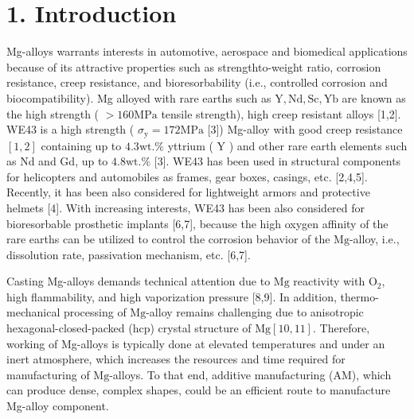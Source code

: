 \documentclass[10pt]{article}
\begin{document}
\section*{1. Introduction}
Mg-alloys warrants interests in automotive, aerospace and biomedical applications because of its attractive properties such as strengthto-weight ratio, corrosion resistance, creep resistance, and bioresorbability (i.e., controlled corrosion and biocompatibility). Mg alloyed with rare earths such as $\mathrm{Y}, \mathrm{Nd}, \mathrm{Sc}, \mathrm{Yb}$ are known as the high strength ( $>160 \mathrm{MPa}$ tensile strength), high creep resistant alloys [1,2]. WE43 is a high strength ( $\sigma_{\mathrm{y}}=172 \mathrm{MPa}$ [3]) Mg-alloy with good creep resistance $[1,2]$ containing up to $4.3 \mathrm{wt} . \%$ yttrium ( $\mathrm{Y}$ ) and other rare earth elements such as Nd and Gd, up to $4.8 \mathrm{wt} . \%$ [3]. WE43 has been used in structural components for helicopters and automobiles as frames, gear boxes, casings, etc. [2,4,5]. Recently, it has been also considered for lightweight armors and protective helmets [4]. With increasing interests, WE43 has been also considered for bioresorbable prosthetic implants [6,7], because the high oxygen affinity of the rare earths can be utilized to control the corrosion behavior of the $\mathrm{Mg}$-alloy, i.e., dissolution rate, passivation mechanism, etc. [6,7].

Casting Mg-alloys demands technical attention due to $\mathrm{Mg}$ reactivity with $\mathrm{O}_{2}$, high flammability, and high vaporization pressure [8,9]. In addition, thermo-mechanical processing of $\mathrm{Mg}$-alloy remains challenging due to anisotropic hexagonal-closed-packed (hcp) crystal structure of $\mathrm{Mg}[10,11]$. Therefore, working of Mg-alloys is typically done at elevated temperatures and under an inert atmosphere, which increases the resources and time required for manufacturing of $\mathrm{Mg}$-alloys. To that end, additive manufacturing (AM), which can produce dense, complex shapes, could be an efficient route to manufacture Mg-alloy component.
\end{document}
